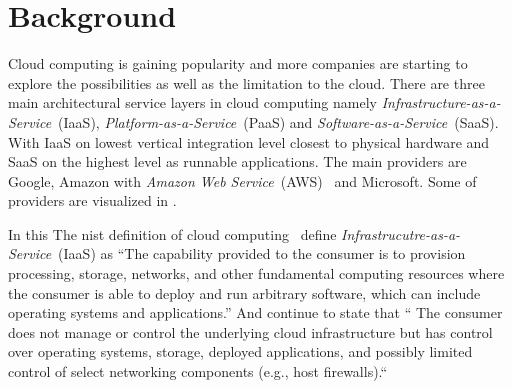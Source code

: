 \chapter{Background}





Cloud computing is gaining popularity and more companies are starting 
to explore the possibilities as well as the limitation to the cloud.
There are three main architectural service layers in cloud computing\cite{introduction:wozniak10}
namely \emph{Infrastructure-as-a-Service}~(IaaS), \emph{Platform-as-a-Service}~(PaaS)
and \emph{Software-as-a-Service}~(SaaS).
With IaaS on lowest vertical integration level closest to physical hardware and SaaS on the highest
level as runnable applications.
The main providers are Google, Amazon with \emph{Amazon Web Service}~(AWS)~\cite{aws} and Microsoft.
Some of providers are visualized in .


In this 
The nist definition of cloud computing~\cite{nist:mell11}
define \emph{Infrastrucutre-as-a-Service}~(IaaS) as
``The capability provided to the consumer is to provision 
processing, storage, networks, and other fundamental computing resources where the 
consumer is able to deploy and run arbitrary software, which can include operating 
systems and applications.'' 
And continue to state that `` The consumer does not manage or control the underlying cloud 
infrastructure but has control over operating systems, storage, deployed applications, and 
possibly limited control of select networking components (e.g., host firewalls).``

